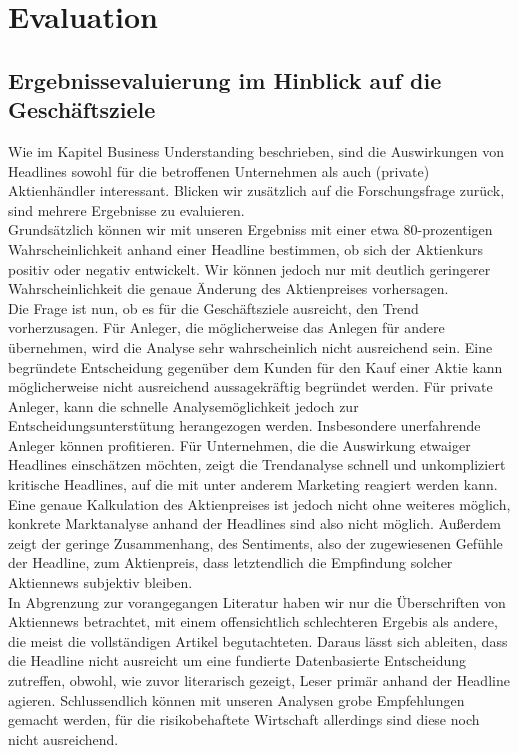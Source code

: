 \chapter{Evaluation} %

\section{Ergebnissevaluierung im Hinblick auf die Geschäftsziele}
Wie im Kapitel Business Understanding beschrieben, sind die Auswirkungen von Headlines sowohl für die betroffenen Unternehmen als auch (private) Aktienhändler interessant. Blicken wir zusätzlich auf die Forschungsfrage zurück, sind mehrere Ergebnisse zu evaluieren.\\
Grundsätzlich können wir mit unseren Ergebniss mit einer etwa 80-prozentigen Wahrscheinlichkeit anhand einer Headline bestimmen, ob sich der Aktienkurs positiv oder negativ entwickelt. Wir können jedoch nur mit deutlich geringerer Wahrscheinlichkeit die genaue Änderung des Aktienpreises vorhersagen. \\
Die Frage ist nun, ob es für die Geschäftsziele ausreicht, den Trend vorherzusagen. Für Anleger, die möglicherweise das Anlegen für andere übernehmen, wird die Analyse sehr wahrscheinlich nicht ausreichend sein. Eine begründete Entscheidung gegenüber dem Kunden für den Kauf einer Aktie kann möglicherweise nicht ausreichend aussagekräftig begründet werden. Für private Anleger, kann die schnelle Analysemöglichkeit jedoch zur Entscheidungsunterstütung herangezogen werden. Insbesondere unerfahrende Anleger können profitieren. Für Unternehmen, die die Auswirkung etwaiger Headlines einschätzen möchten, zeigt die Trendanalyse schnell und unkompliziert kritische Headlines, auf die mit unter anderem Marketing reagiert werden kann. Eine genaue Kalkulation des Aktienpreises ist jedoch nicht ohne weiteres möglich, konkrete Marktanalyse anhand der Headlines sind also nicht möglich. Außerdem zeigt der geringe Zusammenhang, des Sentiments, also der zugewiesenen Gefühle der Headline, zum Aktienpreis, dass letztendlich die Empfindung solcher Aktiennews subjektiv bleiben.\\
In Abgrenzung zur vorangegangen Literatur haben wir nur die Überschriften von Aktiennews betrachtet, mit einem offensichtlich schlechteren Ergebis als andere, die meist die vollständigen Artikel begutachteten. Daraus lässt sich ableiten, dass die Headline nicht ausreicht um eine fundierte Datenbasierte Entscheidung zutreffen, obwohl, wie zuvor literarisch gezeigt, Leser primär anhand der Headline agieren.
Schlussendlich können mit unseren Analysen grobe Empfehlungen gemacht werden, für die risikobehaftete Wirtschaft allerdings sind diese noch nicht ausreichend.

